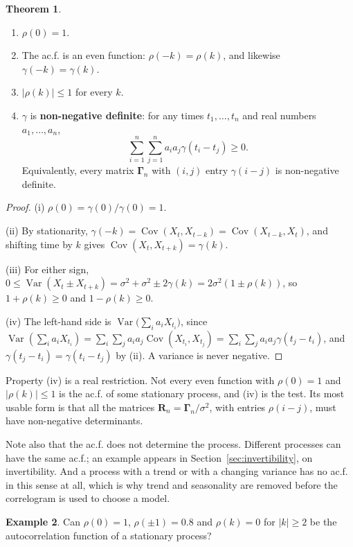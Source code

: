 \documentclass[11pt,a4paper]{article}
\theoremstyle{definition}
\newtheorem{thm}{Theorem}[subsection]
\newtheorem{exa}[thm]{Example}
\DeclareMathOperator{\Var}{Var}
\DeclareMathOperator{\Cov}{Cov}
\begin{document}
\begin{thm}\label{thm:acf-properties}
\begin{enumerate}[label=(\roman*)]
\item $\rho(0) = 1$.
\item The ac.f. is an even function: $\rho(-k) = \rho(k)$, and likewise $\gamma(-k) = \gamma(k)$.
\item $|\rho(k)| \le 1$ for every $k$.
\item $\gamma$ is \textbf{non-negative definite}: for any times $t_1, \dots, t_n$ and real numbers $a_1, \dots, a_n$,
\[
\sum_{i=1}^n\sum_{j=1}^n a_ia_j\gamma(t_i - t_j) \ge 0 .
\]
Equivalently, every matrix $\boldsymbol\Gamma_n$ with $(i, j)$ entry $\gamma(i - j)$ is non-negative definite.
\end{enumerate}
\end{thm}

\begin{proof}
(i) $\rho(0) = \gamma(0)/\gamma(0) = 1$.

(ii) By stationarity, $\gamma(-k) = \Cov(X_t, X_{t-k}) = \Cov(X_{t-k}, X_t)$, and shifting time by $k$ gives $\Cov(X_t, X_{t+k}) = \gamma(k)$.

(iii) For either sign, $0 \le \Var(X_t \pm X_{t+k}) = \sigma^2 + \sigma^2 \pm 2\gamma(k) = 2\sigma^2(1 \pm \rho(k))$, so $1 + \rho(k) \ge 0$ and $1 - \rho(k) \ge 0$.

(iv) The left-hand side is $\Var\bigl(\sum_ia_iX_{t_i}\bigr)$, since
$\Var(\sum_ia_iX_{t_i}) = \sum_i\sum_ja_ia_j\Cov(X_{t_i}, X_{t_j}) = \sum_i\sum_ja_ia_j\gamma(t_j - t_i)$, and $\gamma(t_j - t_i) = \gamma(t_i - t_j)$ by (ii). A variance is never negative.
\end{proof}

Property (iv) is a real restriction. Not every even function with $\rho(0) = 1$ and $|\rho(k)| \le 1$ is the ac.f. of some
stationary process, and (iv) is the test. Its most usable form is that all the matrices $\mathbf{R}_n = \boldsymbol\Gamma_n/\sigma^2$, with entries
$\rho(i - j)$, must have non-negative determinants.

Note also that the ac.f. does not determine the process. Different processes can have the same ac.f.; an
example appears in Section~\ref{sec:invertibility}, on invertibility. And a process with a trend or with a changing variance has
no ac.f. in this sense at all, which is why trend and seasonality are removed before the correlogram is used to
choose a model.

\begin{exa}\label{exa:not-acf}
Can $\rho(0) = 1$, $\rho(\pm1) = 0.8$ and $\rho(k) = 0$ for $|k| \ge 2$ be the autocorrelation function of a stationary process?
\end{exa}
\end{document}
